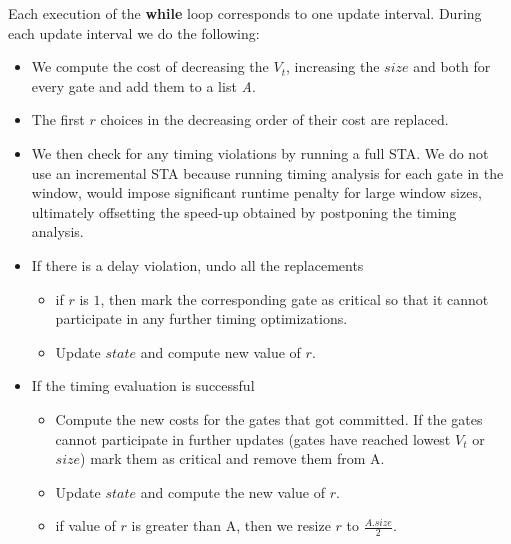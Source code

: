 
Each execution of the \textbf{while} loop corresponds to one update interval. During each  update interval we do the following:
\begin{itemize}
\item We compute the cost of decreasing the $V_t$, increasing the $size$ and both for every gate and add them to a list \textit{A}.
\item The first $r$ choices in the decreasing order of their cost are replaced.
\item We then check for any timing violations by running a full STA. We do not use an incremental STA because running timing analysis for each gate in the window, would impose significant runtime penalty for large window sizes, ultimately offsetting the speed-up obtained by postponing the timing analysis.
\item If there is a delay violation, undo all the replacements 
\begin{itemize}
\item if $r$ is $1$, then mark the corresponding gate as critical so that it cannot participate in any further timing optimizations.
\item Update $state$ and compute new value of $r$.
\end{itemize}
\item If the timing evaluation is successful
\begin{itemize}
    \item Compute the new costs for the gates that got committed. If the gates cannot participate in further updates (gates have reached lowest $V_t$ or $size$) mark them as critical and remove them from A.
\item Update $state$ and compute the new value of $r$.
\item if value of $r$ is greater than A, then we resize $r$ to $\frac{A.size}{2}$.
\end{itemize}

\end{itemize}

